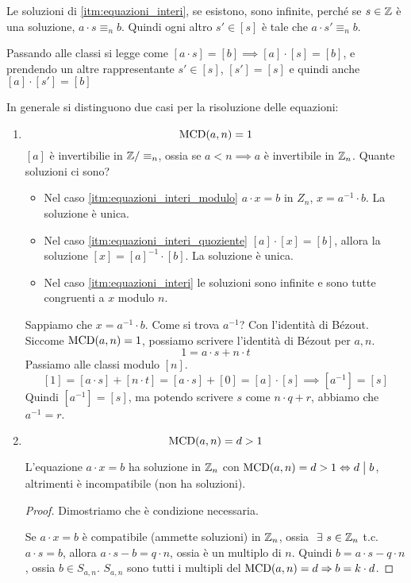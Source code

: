 \begin{oss}
Le soluzioni di \ref{itm:equazioni_interi}, se esistono, sono infinite, perch\'e se $s \in \mathbb{Z}$ \`e una soluzione, $a \cdot s \equiv_n b$. Quindi ogni altro $s' \in [s]$ \`e tale che $a \cdot s' \equiv_n b$.

Passando alle classi si legge come $[a \cdot s] = [b] \implies [a] \cdot [s] = [b]$, e prendendo un altre rappresentante $s' \in [s]$, $[s'] = [s]$ e quindi anche $[a] \cdot [s'] = [b]$
\end{oss}

In generale si distinguono due casi per la risoluzione delle equazioni:
\begin{enumerate}
    \item
    \[
    \operatorname{MCD}(a, n) = 1
    \]
    $[a]$ \`e invertibilie in $\mathbb{Z} / \equiv_n$, ossia se $a < n \implies a$ \`e invertibile in $\mathbb{Z}_n$. Quante soluzioni ci sono?
    \begin{itemize}
        \item Nel caso \ref{itm:equazioni_interi_modulo} $a \cdot x = b$ in $Z_n$, $x = a^{-1} \cdot b$. La soluzione \`e unica.
        \item Nel caso \ref{itm:equazioni_interi_quoziente} $[a] \cdot [x] = [b]$, allora la soluzione $[x] = [a]^{-1} \cdot [b]$. La soluzione \`e unica.
        \item Nel caso \ref{itm:equazioni_interi} le soluzioni sono infinite e sono tutte congruenti a $x$ modulo $n$.
    \end{itemize}
    Sappiamo che $x = a^{-1} \cdot b$. Come si trova $a^{-1}$? Con l'identit\`a di B\'ezout. Siccome $\operatorname{MCD}(a,n) = 1$, possiamo scrivere l'identit\`a di B\'ezout per $a, n$.
    \[
    1 = a \cdot s + n \cdot t
    \]
    Passiamo alle classi modulo $[n]$.
    \[
    [1] = [a \cdot s] + [n \cdot t] = [a \cdot s] + [0] = [a] \cdot [s]
    \implies [a^{-1}] = [s]
    \]
    Quindi $[a^{-1}] = [s]$, ma potendo scrivere $s$ come $n \cdot q + r$, abbiamo che $a^{-1} = r$.

    \item 
    \[
    \operatorname{MCD}(a, n) = d > 1
    \]
    \begin{prop}
    L'equazione $a \cdot x = b$ ha soluzione in $\mathbb{Z}_n$ con $\operatorname{MCD}(a, n) = d > 1 \Leftrightarrow d \bigm| b$, altrimenti \`e incompatibile (non ha soluzioni).
    \end{prop}
    \begin{proof}
    Dimostriamo che \`e condizione necessaria.

    Se $a \cdot x = b$ \`e compatibile (ammette soluzioni) in $\mathbb{Z}_n$, ossia $\exists s \in \integers_n$ t.c. $a \cdot s = b$, allora $a \cdot s - b = q \cdot n$, ossia \`e un multiplo di $n$. Quindi $b = a \cdot s - q \cdot n$, ossia $b \in S_{a, n}$. $S_{a,n}$ sono tutti i multipli del $\operatorname{MCD}(a,n) = d \Rightarrow b = k \cdot d$.


\end{proof}
\end{enumerate}
